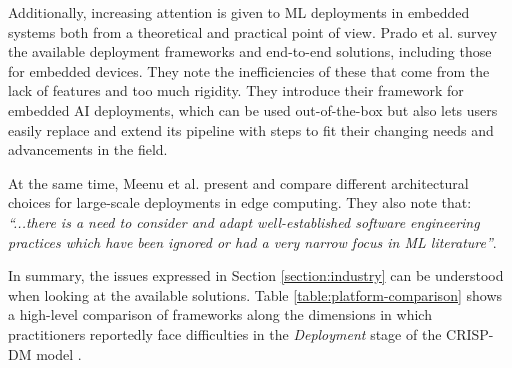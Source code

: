 Additionally, increasing attention is given to ML deployments in embedded systems both from a theoretical \cite{john2020ai} and practical \cite{prado2020bonseyes} point of view. Prado et al. \cite{prado2020bonseyes} survey the available deployment frameworks and end-to-end solutions, including those for embedded devices. They note the inefficiencies of these that come from the lack of features and too much rigidity. They introduce their framework for embedded AI deployments, which can be used out-of-the-box but also lets users easily replace and extend its pipeline with steps to fit their changing needs and advancements in the field. 

At the same time, Meenu et al. \cite{john2020ai} present and compare different architectural choices for large-scale deployments in edge computing. They also note that: \textit{``...there is a need to consider and adapt well-established software engineering practices which have been ignored or had a very narrow focus in ML literature''}.

In summary, the issues expressed in Section \ref{section:industry} can be understood when looking at the available solutions. Table \ref{table:platform-comparison} shows a high-level comparison of frameworks along the dimensions in which practitioners reportedly face difficulties in the \textit{Deployment} stage of the CRISP-DM model \cite{wirth2000crisp}.

